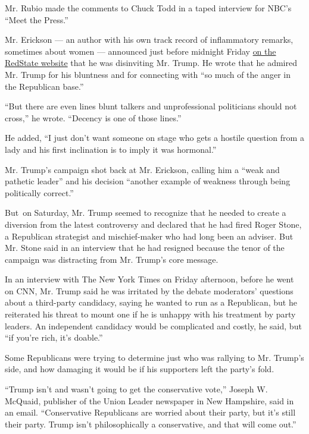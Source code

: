 Mr. Rubio made the comments to Chuck Todd in a taped interview for NBC's
``Meet the Press.''

Mr. Erickson --- an author with his own track record of inflammatory
remarks, sometimes about women --- announced just before midnight Friday
\href{http://www.redstate.com/2015/08/07/i-have-disinvited-donald-trump-to-the-redstate-gathering/}{on
the RedState website} that he was disinviting Mr. Trump. He wrote that
he admired Mr. Trump for his bluntness and for connecting with ``so much
of the anger in the Republican base.''

``But there are even lines blunt talkers and unprofessional politicians
should not cross,'' he wrote. ``Decency is one of those lines.''

He added, ``I just don't want someone on stage who gets a hostile
question from a lady and his first inclination is to imply it was
hormonal.''

Mr. Trump's campaign shot back at Mr. Erickson, calling him a ``weak and
pathetic leader'' and his decision ``another example of weakness through
being politically correct.''

But~on Saturday, Mr. Trump seemed to recognize that he needed to create
a diversion from the latest controversy and declared that he had fired
Roger Stone, a Republican strategist and mischief-maker who had long
been an adviser. But Mr. Stone said in an interview that he had resigned
because the tenor of the campaign was distracting from Mr. Trump's core
message.

In an interview with The New York Times on Friday afternoon, before he
went on CNN, Mr. Trump said he was irritated by the debate moderators'
questions about a third-party candidacy, saying he wanted to run as a
Republican, but he reiterated his threat to mount one if he is unhappy
with his treatment by party leaders. An independent candidacy would be
complicated and costly, he said, but ``if you're rich, it's doable.''

Some Republicans were trying to determine just who was rallying to Mr.
Trump's side, and how damaging it would be if his supporters left the
party's fold.

``Trump isn't and wasn't going to get the conservative vote,'' Joseph W.
McQuaid, publisher of the Union Leader newspaper in New Hampshire, said
in an email. ``Conservative Republicans are worried about their party,
but it's still their party. Trump isn't philosophically a conservative,
and that will come out.''

